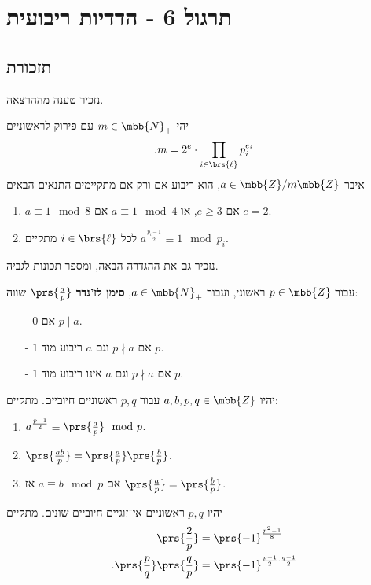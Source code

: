 \documentclass[a4paper,10pt,twoside,openany]{book}
\begin{document}
\chapter{תרגול 6 - הדדיות ריבועית}

\section*{תזכורת}

נזכיר טענה מההרצאה.

\begin{proposition}
יהי
$m \in \mbb{N}_+$
עם פירוק לראשוניים
\[\text{.} m = 2^e \cdot \prod_{i \in \brs{\ell}} p_i^{e_i}\]
איבר
$a \in \mbb{Z} / m\mbb{Z}$,
הוא ריבוע אם ורק אם מתקיימים התנאים הבאים
\begin{enumerate}
\item $a \equiv 1 \mod{8}$
אם
$e \geq 3$,
או
$a \equiv 1 \mod{4}$
אם
$e = 2$.
\item לכל
$i \in \brs{\ell}$
מתקיים
$a^{\frac{p_i - 1}{2}} \equiv 1 \mod{p_i}$.
\end{enumerate}
\end{proposition}

נזכיר גם את ההגדרה הבאה, ומספר תכונות לגביה.

\begin{definition}
עבור
$p \in \mbb{Z}$
ראשוני, ועבור
$a \in \mbb{N}_+$,
\textbf{סימן לז'נדר}
$\prs{\frac{a}{p}}$
שווה:
\begin{itemize}
\item[-] $0$ אם $p \mid a$.
\item[-] $1$ אם $p \nmid a$ וגם $a$ ריבוע מוד $p$.
\item[-] $1$ אם $p \nmid a$ וגם $a$ אינו ריבוע מוד $p$.
\end{itemize}
\end{definition}

\begin{proposition}
יהיו
$a,b,p,q \in \mbb{Z}$
עבור
$p,q$
ראשוניים חיוביים.
מתקיים:
\begin{enumerate}
\item $a^{\frac{p-1}{2}} \equiv \prs{\frac{a}{p}} \mod{p}$.
\item $\prs{\frac{ab}{p}} = \prs{\frac{a}{p}} \prs{\frac{b}{p}}$.
\item אם
$a \equiv b \mod{p}$
אז
$\prs{\frac{a}{p}} = \prs{\frac{b}{p}}$.
\end{enumerate}
\end{proposition}

\begin{theorem}
יהיו
$p,q$
ראשוניים אי־זוגיים חיוביים שונים. מתקיים
\begin{align*}
\prs{\frac{2}{p}} &= \prs{-1}^{\frac{p^2 - 1}{8}} \\
\text{.} \prs{\frac{p}{q}} \prs{\frac{q}{p}} &= \prs{-1}^{\frac{p-1}{2} \cdot \frac{q-1}{2}}
\end{align*}
\end{theorem}
\end{document}
